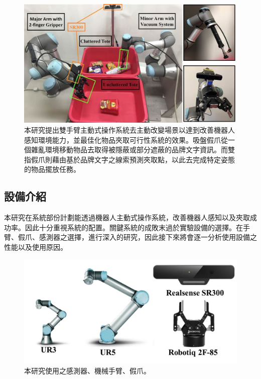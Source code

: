 \begin{figure}[ht]
	\centering
	\includegraphics[height=!, width=1.0\linewidth, keepaspectratio=true]
	{./figures/hardware_archi_v2.jpg}
  \caption{本研究提出雙手臂主動式操作系統去主動改變場景以達到改善機器人感知環境能力，並最佳化物品夾取可行性系統的效果。吸盤假爪從一個雜亂環境移動物品去取得被隱蔽或部分遮蔽的品牌文字資訊。而雙指假爪則藉由基於品牌文字之線索預測夾取點，以此去完成特定姿態的物品擺放任務。}
  \label{figure:robot_system_v2}
\end{figure}


\subsection{設備介紹}
本研究在系統部份計劃能透過機器人主動式操作系統，改善機器人感知以及夾取成功率。因此十分重視系統的配置。關鍵系統的成敗末過於實驗設備的選擇。在手臂、假爪、感測器之選擇，進行深入的研究，因此接下來將會逐一分析使用設備之性能以及使用原因。

\begin{figure}[ht]
  \centering
  \includegraphics[height=!, width=1.0\linewidth, keepaspectratio=true]
  {./figures/hardware_list.jpg}
  \caption{本研究使用之感測器、機械手臂、假爪。}
  \label{figure:hardware_list}
\end{figure}


